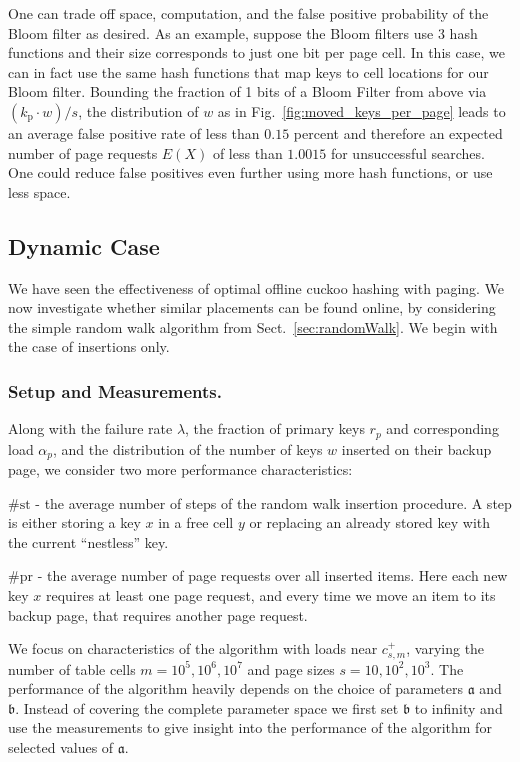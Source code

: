 \let\accentvec\vec \documentclass{llncs}
\newcommand{\fr}{\lambda}
\newcommand{\npn}{r_p}
\newcommand{\npm}{\alpha_p}
\newcommand{\pr}{{\scriptstyle \#}\mathrm{pr}}
\newcommand{\st}{{\scriptstyle \#}\mathrm{st}}
\newcommand{\kprim}{{k_{\mathrm{p}}}}
\newcommand{\palpha}{\mathfrak{a}}
\newcommand{\pbeta}{\mathfrak{b}}
\newcommand{\wb}{w}
\newcommand{\tb}{{c^{\scriptscriptstyle+}_{s,m}}}
\begin{document}
One can trade off space, computation, and the false positive
probability of the Bloom filter as desired.  As an example, suppose
the Bloom filters use $3$ hash functions and their size corresponds to
just one bit per page cell. In this case, we can in fact use the same
hash functions that map keys to cell locations for our Bloom filter.
Bounding the fraction of 1 bits of a Bloom Filter
from above via $(\kprim \cdot w)/s$, the distribution of $\wb$ as in
Fig.~\ref{fig:moved_keys_per_page} leads to an average false positive
rate of less than $0.15$ percent and therefore an expected number of page
requests $E(X)$ of less than $1.0015$ for unsuccessful searches.  One could
reduce false positives even further using more hash functions, or use
less space.

\subsection{Dynamic Case}
We have seen the effectiveness of optimal offline cuckoo hashing with paging.
We now investigate whether similar placements can be found online, by considering the simple random walk algorithm
from Sect.~\ref{sec:randomWalk}.  We begin with the case of insertions only.

\subsubsection{Setup and Measurements.}
Along with the failure rate $\fr$, 
the fraction of primary keys $\npn$ and corresponding load $\npm$, 
and the distribution of the number of keys $\wb$ inserted on their backup page,
we consider two more performance characteristics:
\begin{compactitem}
\item[$\st$] - the average number of steps of the random walk insertion procedure. A step is either storing a key $x$ in a free cell $y$ or replacing an already stored key with the current ``nestless'' key.
\item[$\pr$] - the average number of page requests over all inserted items. Here each new key $x$ requires at least one page request, and every time we move an item to its backup page, that requires another page request. 
\end{compactitem}


We focus on characteristics of the algorithm with loads near $\tb$, varying the number of table cells $m=10^5,10^6,10^7$ and page sizes $s=10,10^2,10^3$. The performance of the algorithm heavily depends on the choice of parameters $\palpha$ and $\pbeta$. Instead of covering the complete parameter space we first set $\pbeta$ to infinity and use the measurements to give insight into the performance of the algorithm for selected values of $\palpha$.
\end{document}
